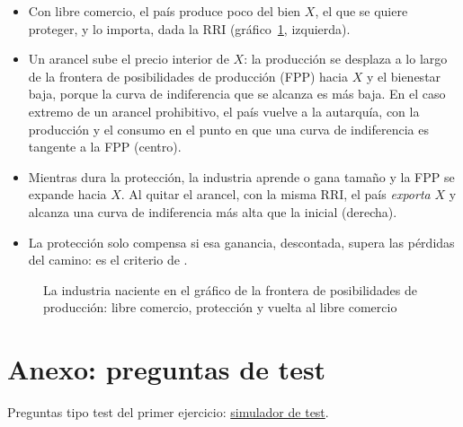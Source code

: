 \documentclass[11pt]{article}
\begin{document}
\begin{itemize}
\item Con libre comercio, el país produce poco del bien $X$, el que se quiere proteger, y lo importa, dada la RRI (gráfico~\ref{fig:industria-naciente-fpp}, izquierda).
\item Un arancel sube el precio interior de $X$: la producción se desplaza a lo largo de la frontera de posibilidades de producción (FPP) hacia $X$ y el bienestar baja, porque la curva de indiferencia que se alcanza es más baja. En el caso extremo de un arancel prohibitivo, el país vuelve a la autarquía, con la producción y el consumo en el punto en que una curva de indiferencia es tangente a la FPP (centro).
\item Mientras dura la protección, la industria aprende o gana tamaño y la FPP se expande hacia $X$. Al quitar el arancel, con la misma RRI, el país \emph{exporta} $X$ y alcanza una curva de indiferencia más alta que la inicial (derecha).
\item La protección solo compensa si esa ganancia, descontada, supera las pérdidas del camino: es el criterio de .
\end{itemize}
\begin{figure}[H]
\centering
\caption{La industria naciente en el gráfico de la frontera de posibilidades de producción: libre comercio, protección y vuelta al libre comercio}\label{fig:industria-naciente-fpp}
\end{figure}

\section{Anexo: preguntas de test}\label{anexo:test}

\begin{anotaciones}
Preguntas tipo test del primer ejercicio: \href{https://www.victorgutierrezmarcos.es/oposicion/temario/primer-ejercicio/test/simulador.html?tema=3.B.8}{simulador de test}.
\end{anotaciones}

\bibliografia
\end{document}
